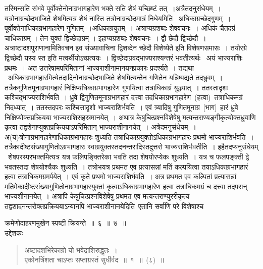\documentclass[11pt, openany]{book}
\begin{document}
\noindent
तस्मिन्सति संभवे पूर्वोक्तेनोनाग्रभागहारेण भक्ते सति शेषं यच्छिष्टं तत्~।अत्रैतदनुसंधेयम्~। यत्रोनाग्रच्छेदभाजिते शेषमित्यत्र शेषं नास्ति तत्रोनाग्रच्छेदमात्रं निधेयमिति \textendash\ अधिकाग्रच्छेदगुणम्~। पूर्वोक्तेनाधिकाग्रभागहारेण गुणितम्~।अधिकाग्रयुतम्~। अत्राप्यग्रशब्दः शेषवचनः~। अधिकं चैतदग्रं चाधिकाग्रम् । तेन युक्तं द्विच्छेदाग्रम् । इहाप्यग्रशब्दः शेषवचनः~। द्वौ छेदौ द्विच्छेदौ~।अत्राष्टादशपुराणानामितिवचन इव संख्यावाचिना द्विशब्देन च्छेदौ विशेष्येते इति विशेषणसमासः~। तयोरग्रे द्विच्छेदौ यस्य स्त इति मत्वर्थीयोऽच्प्रत्ययः~। द्विच्छेदाग्रवद्भाज्यराश्यन्तरं भवतीत्यर्थः \textendash\ अयं भाज्यराशिः प्रथमः~। अत उत्तरेषामपरिमितानां भाज्यराशीनामानयनप्रकारः प्रदर्श्यते~। तद्यथा \textendash\ अधिकाग्रभागहारमित्येतदादिनोनाग्रच्छेदभाजिते शेषमित्यन्तेन गणितेन यन्निष्पद्यते तदध्रुवम्~। तत्रैकगुणितमूनाग्रभागहारं निक्षिप्यधिकाग्रभागहारेण गुणयित्वा तत्राधिकाग्रं युञ्ज्यात्~। ततस्तादृशः कश्चिद्भाज्यराशिर्भवति~। ध्रुवे द्विगुणितमूनाग्रभागहारं दत्त्वा तदधिकाग्रभागहारेण~(हत्वा)~तत्राधिकमग्रं निदध्यात्~। ततस्तदपरः कश्चित्तादृशो भाज्यराशिर्भवति~। एवं त्र्यादिषु गुणितमूनाग्र~[भाग]~हारं ध्रुवे निक्षिप्योक्तप्रक्रियया
भाज्यराशिसहस्रमानयेत्~। अथात्र केषुचित्प्रश्नविशेषेषु मत्यन्तराण्यङ्गीकृत्योक्तध्रुवाणि
कृत्वा तद्वशेनाप्युक्तप्रक्रिययाऽपरिमितान् भाज्यराशीनानयेत्~। अत्रेदमनुसंधेयम्~। अ(य)त्रोनाग्रभागहारेणाधिकाग्रभागहारः शुध्यति तत्राधिकाग्रयुक्तोऽधिकाग्रभागहारः प्रथमो भाज्यराशिर्भवति~। तत्रैकादीष्टसंख्यागुणितोऽग्रभागहारः स्वाग्रयुक्तस्तदनन्तरादिस्तदुत्तरो भाज्यराशिर्भवतीति~। इहैतदप्यनुसंधेयम् \textendash\ शेषपरस्परभक्तमित्यत्र यत्र फलिपङ्क्तिरेका भवति तदा शेषयोरप्येकः
शुध्यति~। यत्र च फलपङ्क्ती द्वे भवतस्तदा शेषयोश्चैकः शुध्यति~। तत्रोभयत्र प्रथमत एव प्रत्यासन्नां मतिं कल्पयित्वा तयाऽधिकाग्रभागहारं हत्वा तत्राधिकमग्रमर्पयेत्~। एवं कृते प्रथमो भाज्यराशिर्भवति~। अत्र प्रथमत एव कल्पितां प्रत्यासन्नां मतिमेकादीष्टसंख्यागुणितोनाग्रभागहारयुक्तां कृत्वाऽधिकाग्रभागहारेण हत्वा तत्राधिकमग्रं च दत्त्वा तदपरान् भाज्यशीनानयेत्~। अत्रापि केषुचित्प्रश्नविशेषेषु प्रथमत एव मत्यन्तराण्युररीकृत्य तद्वशादनन्तरोक्तप्रक्रिययाऽन्यानपि भाज्यराशीनानयेदिति\textendash\ एतानि सर्वाणि परे विशेषाश्च 
\newpage
\thispagestyle{fancy}
\fancyhf{}

क्रमेणोदाहरणमुखेन स्पष्टी क्रियन्ते~॥~६~॥~७~॥\\

\noindent उद्देशकः \textendash 
\begin{quote}
{\ku अष्टादशभिरेकाग्रो यो भवेद्राशिरुद्धृतः~।\\
एकोनत्रिंशता चाऽप्तः सप्ताग्रस्तं सुधीर्वद~॥~१~॥~(८)~॥}
\end{quote}
\end{document}
